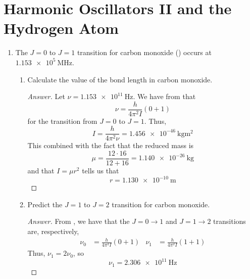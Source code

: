 \documentclass[../psets.tex]{subfiles}
\begin{document}
\section{Harmonic Oscillators II and the Hydrogen Atom}
\begin{enumerate}
    \item {}The $J=0$ to $J=1$ transition for carbon monoxide () occurs at $\SI{1.153e5}{\mega\hertz}$.
    \begin{enumerate}
        \item Calculate the value of the bond length in carbon monoxide.
        \begin{proof}[Answer]
            Let $\nu=\SI{1.153e11}{\hertz}$. We have from \textcite{bib:McQuarrieSimon} that
            \begin{equation*}
                \nu = \frac{h}{4\pi^2I}(0+1)
            \end{equation*}
            for the transition from $J=0$ to $J=1$. Thus,
            \begin{equation*}
                I = \frac{h}{4\pi^2\nu} = \SI{1.456e-46}{\kilo\gram\meter\squared}
            \end{equation*}
            This combined with the fact that the reduced mass is
            \begin{equation*}
                \mu = \frac{12\cdot 16}{12+16} = \SI{1.140e-26}{\kilo\gram}
            \end{equation*}
            and that $I=\mu r^2$ tells us that
            \begin{equation*}
                \boxed{r = \SI{1.130e-10}{\meter}}
            \end{equation*}
        \end{proof}
        \item Predict the $J=1$ to $J=2$ transition for carbon monoxide.
        \begin{proof}[Answer]
            From \textcite{bib:McQuarrieSimon}, we have that the $J=0\to 1$ and $J=1\to 2$ transitions are, respectively,
            \begin{align*}
                \nu_0 &= \frac{h}{4\pi^2I}(0+1)&
                \nu_1 &= \frac{h}{4\pi^2I}(1+1)
            \end{align*}
            Thus, $\nu_1=2\nu_0$, so
            \begin{equation*}
                \boxed{\nu_1 = \SI{2.306e11}{\hertz}}
            \end{equation*}
        \end{proof}

\end{enumerate}
\end{enumerate}
\end{document}
